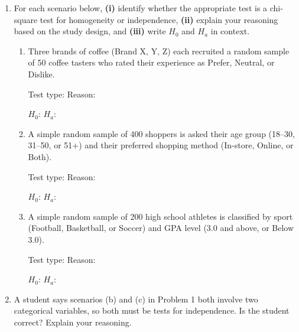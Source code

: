 \documentclass[10pt]{article}
\begin{document}
\namedateperiod

\vspace{0.1in}

\begin{enumerate}

  \item For each scenario below, \textbf{(i)} identify whether the appropriate test is a
        chi-square test for homogeneity or independence, \textbf{(ii)} explain your reasoning
        based on the study design, and \textbf{(iii)} write $H_0$ and $H_a$ in context.

        \begin{enumerate}[label=(\alph*)]

          \item Three brands of coffee (Brand X, Y, Z) each recruited a random sample of
                50 coffee tasters who rated their experience as Prefer, Neutral, or Dislike.

                Test type: \blank{4cm} \quad Reason: \writeline

                $H_0$: \writeline
                $H_a$: \writeline

                \vspace{0.06in}

          \item A simple random sample of 400 shoppers is asked their age group (18--30,
                31--50, or 51+) and their preferred shopping method (In-store, Online, or Both).

                Test type: \blank{4cm} \quad Reason: \writeline

                $H_0$: \writeline
                $H_a$: \writeline

                \vspace{0.06in}

          \item A simple random sample of 200 high school athletes is classified by sport
                (Football, Basketball, or Soccer) and GPA level (3.0 and above, or Below 3.0).

                Test type: \blank{4cm} \quad Reason: \writeline

                $H_0$: \writeline
                $H_a$: \writeline

        \end{enumerate}

  \item A student says scenarios (b) and (c) in Problem 1 both involve two categorical
        variables, so both must be tests for independence. Is the student correct?
        Explain your reasoning.


\end{enumerate}
\end{document}

